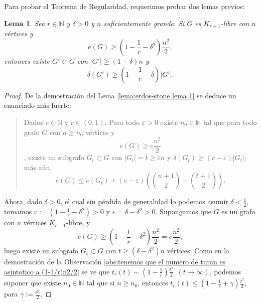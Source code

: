 \documentclass[12pt]{report}
\theoremstyle{plain}
\newtheorem{lemma}[theorem]{Lema}
\theoremstyle{definition}
\newcommand{\naturals}{\mathbb{N}}
\newcommand{\abs}[1]{\left \vert #1 \right \vert}
\begin{document}
Para probar el Teorema de Regularidad, requerimos probar dos lemas previos:

\begin{lemma}\label{lemma: Teorema de Estabilidad de Erdos-simonovits - lema 1}
Sea $r \in \naturals$ y $\delta > 0$ y $n$ suficientemente grande. Si $G$ es $K_{r+1}$-libre con $n$ vértices y
\[
    e(G) \geq \left ( 1 - \frac 1 r - \delta^2\right) \frac{n^2}2,
\]
entonces existe $G' \subset G$ con $\abs{G'} \geq (1 - \delta)n $ y
\[
    \delta (G') \geq \left ( 1 - \frac 1 r - \delta \right) \abs { G'}.
\]
\end{lemma}
\begin{proof}
De la demostración del Lema \ref{lema:erdos-stone lema 1} se deduce un enunciado más fuerte:
\begin{quote}
Dados $r \in \naturals$ y $c\in (0,1)$. Para todo $\varepsilon > 0$ existe $n_0 \in \naturals$ tal que para todo grafo $G$ con $n \geq n_0$ vértices y
\[
    e(G) \geq c \frac{n^2}{2}
\], existe un subgrafo $G_{t} \subset G$ con $\abs {G_t} = t \geq \varepsilon n$ y $\delta (G_t) \geq (c- \varepsilon) \abs{G_t}$; más aún,
\[
    e(G) \leq e(G_t) + (c- \varepsilon) \left (\binom{n+1}2 - \binom{t+1}2\right ).
\]
\end{quote}

Ahora, dado $\delta > 0$, el cual sin pérdida de generalidad lo podemos asumir $\delta < \frac 1 2$, tomamos $c := \left ( 1 - \frac 1 r - \delta^2 \right ) > 0$ y $\varepsilon = \delta - \delta^2>0$. Supongamos que $G$ es un grafo con $n$ vértices $K_{r+1}$-libre, y
\[
    e(G) \geq \left ( 1 - \frac 1 r - \delta^2 \right ) \frac{n^2}{2} = c \frac {n^2}{2},
\]
luego existe un subgrafo $G_t \subset G$ con $t \geq (\delta - \delta^2) n$ vértices. Como en la demostración de la Observación \ref{obs:tenemos que el numero de turan es asintotico a (1-1/r)n2/2} se ve que $t_r (t) \sim  \left ( 1 - \frac 1 r \right) \frac{t^2}{2} \:\: (t \to \infty)$, podemos suponer que existe $n_0 \in \naturals$ tal que si $n \geq n_0$, entonces $t_r (t) \leq \left ( 1 - \frac 1 r + \gamma \right ) \frac{t^2}{2}$, para $\gamma := \frac{\delta^2}{2}$.


\end{proof}
\end{document}
